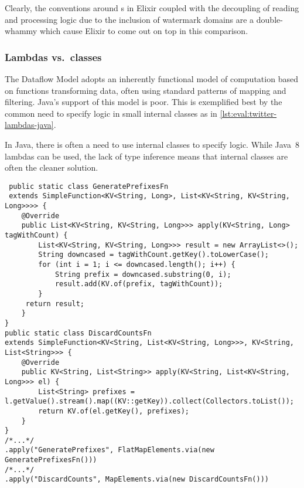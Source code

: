 Clearly, the conventions around s in Elixir coupled with the decoupling of reading and processing logic due to the inclusion of watermark domains are a double-whammy which cause Elixir to come out on top in this comparison.

\subsubsection{Lambdas vs.\ classes}

The Dataflow Model adopts an inherently functional model of computation based on functions transforming data, often using standard patterns of mapping and filtering.
Java's support of this model is poor.
This is exemplified best by the common need to specify logic in small internal classes as in \cref{lst:eval:twitter-lambdas-java}.

\begin{codelisting}
	\caption[Using internal classes to specify transformation logic in Java.]{In Java, there is often a need to use internal classes to specify logic. While Java~8 lambdas can be used, the lack of  type inference means that internal classes are often the cleaner solution.}
	\label{lst:eval:twitter-lambdas-java}
	\begin{verbatim}
 public static class GeneratePrefixesFn
 extends SimpleFunction<KV<String, Long>, List<KV<String, KV<String, Long>>>> {
    @Override
    public List<KV<String, KV<String, Long>>> apply(KV<String, Long> tagWithCount) {
        List<KV<String, KV<String, Long>>> result = new ArrayList<>();
        String downcased = tagWithCount.getKey().toLowerCase();
        for (int i = 1; i <= downcased.length(); i++) {
            String prefix = downcased.substring(0, i);
            result.add(KV.of(prefix, tagWithCount));
        }
     return result;
    }
}
public static class DiscardCountsFn
extends SimpleFunction<KV<String, List<KV<String, Long>>>, KV<String, List<String>>> {
    @Override
    public KV<String, List<String>> apply(KV<String, List<KV<String, Long>>> el) {
        List<String> prefixes = l.getValue().stream().map((KV::getKey)).collect(Collectors.toList());
        return KV.of(el.getKey(), prefixes);
    }
}
/*...*/
.apply("GeneratePrefixes", FlatMapElements.via(new GeneratePrefixesFn()))
/*...*/
.apply("DiscardCounts", MapElements.via(new DiscardCountsFn()))
	\end{verbatim}
\end{codelisting}

